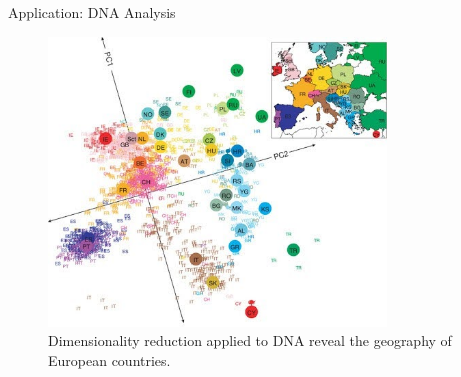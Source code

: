 \begin{frame}{Application: DNA Analysis}
    \begin{figure}
    \centering
    \includegraphics[width=0.8\textwidth,height=0.75\textheight,keepaspectratio]{images/dul-app-dim-reduce.jpg}
    \caption{Dimensionality reduction applied to DNA reveal the geography of European countries.}
    \end{figure}
\end{frame}